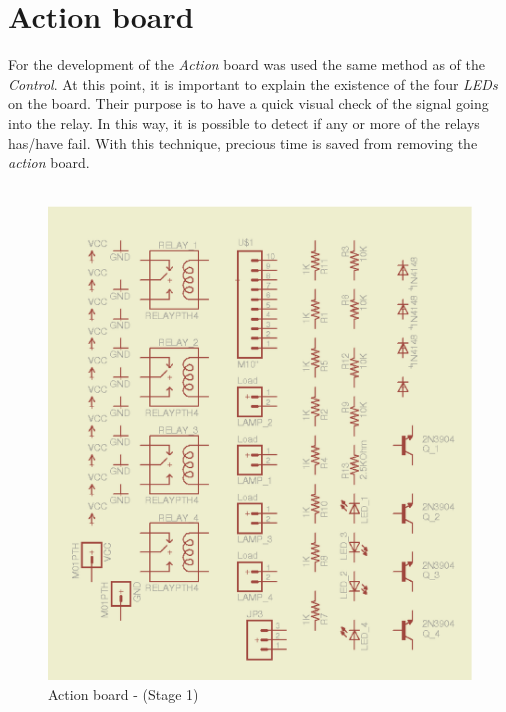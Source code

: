 \documentclass[12pt,a4paper,draft]{report}
\begin{document}
\section{Action board}
For the development of the \textit{Action} board was used the same method as of the \textit{Control}. At this point, it is important to explain the existence of the four \textit{LEDs} on the board. Their purpose is to have a quick visual check of the signal going into the relay. In this way, it is possible to detect if any or more of the relays has/have fail. With this technique, precious time is saved from removing the \textit{action} board. \\
\ \\
\begin{figure}[H]
\centering
\includegraphics*[scale=0.25]{action_brd_s1}
\caption{Action board -  (Stage 1)}
\label{Action-brd-s1}
\end{figure}
\ \\
\end{document}
